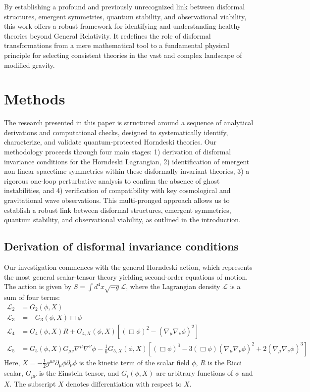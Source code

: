 \documentclass[twocolumn]{aastex631}
\begin{document}
By establishing a profound and previously unrecognized link between disformal structures, emergent symmetries, quantum stability, and observational viability, this work offers a robust framework for identifying and understanding healthy theories beyond General Relativity. It redefines the role of disformal transformations from a mere mathematical tool to a fundamental physical principle for selecting consistent theories in the vast and complex landscape of modified gravity.


\section{Methods}
\label{sec:methods}
The research presented in this paper is structured around a sequence of analytical derivations and computational checks, designed to systematically identify, characterize, and validate quantum-protected Horndeski theories. Our methodology proceeds through four main stages: 1) derivation of disformal invariance conditions for the Horndeski Lagrangian, 2) identification of emergent non-linear spacetime symmetries within these disformally invariant theories, 3) a rigorous one-loop perturbative analysis to confirm the absence of ghost instabilities, and 4) verification of compatibility with key cosmological and gravitational wave observations. This multi-pronged approach allows us to establish a robust link between disformal structures, emergent symmetries, quantum stability, and observational viability, as outlined in the introduction.

\subsection{Derivation of disformal invariance conditions}
Our investigation commences with the general Horndeski action, which represents the most general scalar-tensor theory yielding second-order equations of motion. The action is given by $S = \int d^4x \sqrt{-g} \mathcal{L}$, where the Lagrangian density $\mathcal{L}$ is a sum of four terms:
\begin{align*}
\mathcal{L}_2 &= G_2(\phi, X) \\
\mathcal{L}_3 &= -G_3(\phi, X) \Box\phi \\
\mathcal{L}_4 &= G_4(\phi, X) R + G_{4,X}(\phi, X) [(\Box\phi)^2 - (\nabla_\mu\nabla_\nu\phi)^2] \\
\mathcal{L}_5 &= G_5(\phi, X) G_{\mu\nu} \nabla^\mu\nabla^\nu\phi - \frac{1}{6} G_{5,X}(\phi, X) [(\Box\phi)^3 - 3(\Box\phi)(\nabla_\mu\nabla_\nu\phi)^2 + 2(\nabla_\mu\nabla_\nu\phi)^3]
\end{align*}
Here, $X = -\frac{1}{2}g^{\mu\nu}\partial_\mu\phi\partial_\nu\phi$ is the kinetic term of the scalar field $\phi$, $R$ is the Ricci scalar, $G_{\mu\nu}$ is the Einstein tensor, and $G_i(\phi, X)$ are arbitrary functions of $\phi$ and $X$. The subscript $X$ denotes differentiation with respect to $X$.
\end{document}
